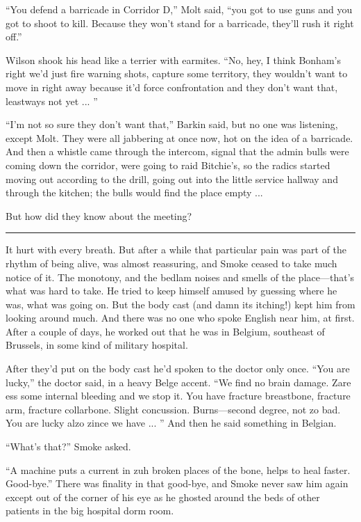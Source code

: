 ``You defend a barricade in Corridor D,'' Molt said, ``you got to use guns and you got to shoot to kill. Because they won't stand for a barricade, they'll rush it right off.''

Wilson shook his head like a terrier with earmites. ``No, hey, I think Bonham's right we'd just fire warning shots, capture some territory, they wouldn't want to move in right away because it'd force confrontation and they don't want that, leastways not yet ... ''

``I'm not so sure they don't want that,'' Barkin said, but no one was listening, except Molt. They were all jabbering at once now, hot on the idea of a barricade. And then a whistle came through the intercom, signal that the admin bulls were coming down the corridor, were going to raid Bitchie's, so the radics started moving out according to the drill, going out into the little service hallway and through the kitchen; the bulls would find the place empty ...

But how did they know about the meeting?

\fancybreak{* * *}

It hurt with every breath. But after a while that particular pain was part of the rhythm of being alive, was almost reassuring, and Smoke ceased to take much notice of it. The monotony, and the bedlam noises and smells of the place---that's what was hard to take. He tried to keep himself amused by guessing where he was, what was going on. But the body cast (and damn its itching!) kept him from looking around much. And there was no one who spoke English near him, at first. After a couple of days, he worked out that he was in Belgium, southeast of Brussels, in some kind of military hospital.

After they'd put on the body cast he'd spoken to the doctor only once. ``You are lucky,'' the doctor said, in a heavy Belge accent. ``We find no brain damage. Zare ess some internal bleeding and we stop it. You have fracture breastbone, fracture arm, fracture collarbone. Slight concussion. Burns---second degree, not zo bad. You are lucky alzo zince we have ... '' And then he said something in Belgian.

``What's that?'' Smoke asked.

``A machine puts a current in zuh broken places of the bone, helps to heal faster. Good-bye.'' There was finality in that good-bye, and Smoke never saw him again except out of the corner of his eye as he ghosted around the beds of other patients in the big hospital dorm room.

